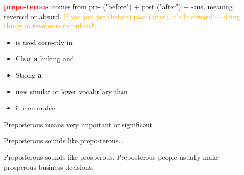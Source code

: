 \begin{figure*}[htb]
\centering
\footnotesize
\begin{minipage}{0.66\textwidth}
    \begin{tcolorbox}[goodbox, title=Good Mnemonic]
        \textcolor{red}{\textbf{preposterous}}: \textcolor{goodgreen}{comes from pre- ("before") + post ("after") + -ous}, meaning reversed or absurd. \textcolor{orange}{If you put pre (before) post (after), it's backward — doing things in reverse is ridiculous!}
    \end{tcolorbox}
\end{minipage}
\hspace{0.5em}
\begin{minipage}{0.3\textwidth}
    \begin{itemize}[leftmargin=*, nosep]
        \item \vocabulary is used correctly in \mnemonic
        \item Clear \textbf{a} linking \vocabulary and \mnemonic
        \item Strong \textbf{a}
        \item \mnemonic uses similar or lower vocabulary than \vocabulary
        \item \mnemonic is memorable
    \end{itemize}
\end{minipage}

\vspace{0.3cm}

\begin{minipage}{0.33\textwidth}
    \begin{tcolorbox}[badbox, title=Incorrect Definition]
        Preposterous means very important or significant
    \end{tcolorbox}
\end{minipage}%
\begin{minipage}{0.33\textwidth}
    \begin{tcolorbox}[badbox, title=Circular Association]
        Preposterous sounds like preposterous...
    \end{tcolorbox}
\end{minipage}%
\begin{minipage}{0.33\textwidth}
    \begin{tcolorbox}[badbox, title=Weak Association]
        Preposterous sounds like prosperous. Preposterous people usually make prosperous business decisions.
    \end{tcolorbox}
\end{minipage}


\end{figure*}
